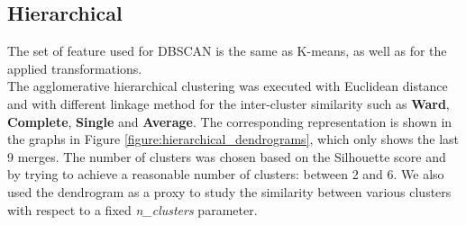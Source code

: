 

\subsection{Hierarchical}
\label{sec:hierarchical}
The set of feature used for DBSCAN is the same as K-means, as well as for the applied transformations.\\
The agglomerative hierarchical clustering was executed with Euclidean distance and with different linkage method for the inter-cluster similarity such as \textbf{Ward}, \textbf{Complete}, \textbf{Single} and \textbf{Average}. The corresponding representation is shown in the graphs in Figure \ref{figure:hierarchical_dendrograms}, which only shows the last 9 merges.
The number of clusters was chosen based on the Silhouette score and by trying to achieve a reasonable number of clusters: between 2 and 6. We also used the dendrogram as a proxy to study the similarity between various clusters with respect to a fixed \textit{n\_clusters} parameter.\\

